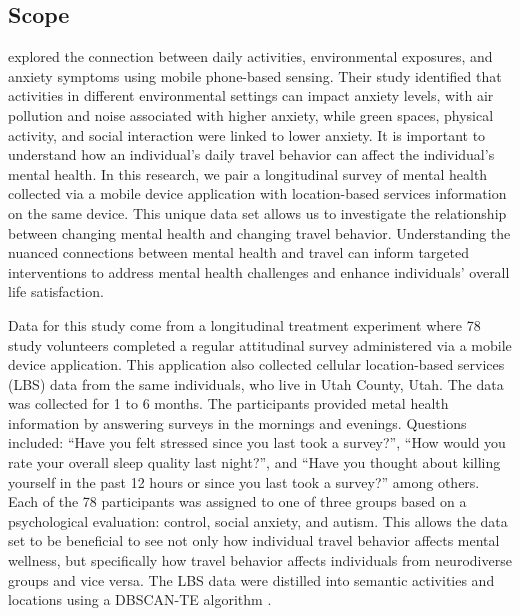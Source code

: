 \documentclass[
  letterpaper,
  authoryear]{elsarticle}
\begin{document}
\hypertarget{scope}{%
\subsection{Scope}\label{scope}}

\citet{lanDailySpacetimeActivities2022} explored the connection between
daily activities, environmental exposures, and anxiety symptoms using
mobile phone-based sensing. Their study identified that activities in
different environmental settings can impact anxiety levels, with air
pollution and noise associated with higher anxiety, while green spaces,
physical activity, and social interaction were linked to lower anxiety.
It is important to understand how an individual's daily travel behavior
can affect the individual's mental health. In this research, we pair a
longitudinal survey of mental health collected via a mobile device
application with location-based services information on the same device.
This unique data set allows us to investigate the relationship between
changing mental health and changing travel behavior. Understanding the
nuanced connections between mental health and travel can inform targeted
interventions to address mental health challenges and enhance
individuals' overall life satisfaction.

Data for this study come from a longitudinal treatment experiment where
78 study volunteers completed a regular attitudinal survey administered
via a mobile device application. This application also collected
cellular location-based services (LBS) data from the same individuals,
who live in Utah County, Utah. The data was collected for 1 to 6 months.
The participants provided metal health information by answering surveys
in the mornings and evenings. Questions included: ``Have you felt
stressed since you last took a survey?'', ``How would you rate your
overall sleep quality last night?'', and ``Have you thought about
killing yourself in the past 12 hours or since you last took a survey?''
among others. Each of the 78 participants was assigned to one of three
groups based on a psychological evaluation: control, social anxiety, and
autism. This allows the data set to be beneficial to see not only how
individual travel behavior affects mental wellness, but specifically how
travel behavior affects individuals from neurodiverse groups and vice
versa. The LBS data were distilled into semantic activities and
locations using a DBSCAN-TE algorithm \citep{riches2022}.
\end{document}
